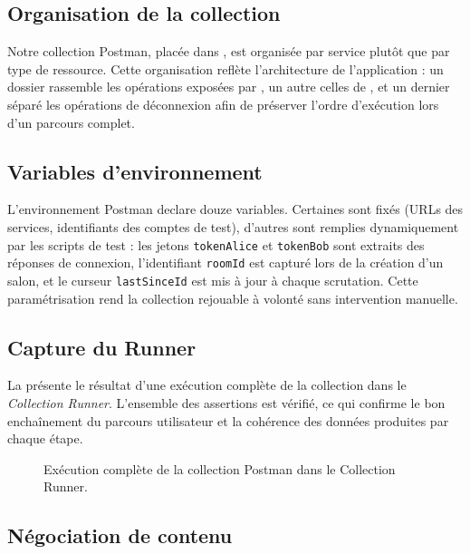 \subsection{Organisation de la collection}

Notre collection Postman, placée dans , est organisée par service plutôt que par type de ressource. Cette organisation reflète l'architecture de l'application : un dossier rassemble les opérations exposées par , un autre celles de , et un dernier séparé les opérations de déconnexion afin de préserver l'ordre d'exécution lors d'un parcours complet.

\subsection{Variables d'environnement}

L'environnement Postman  declare douze variables. Certaines sont fixés (URLs des services, identifiants des comptes de test), d'autres sont remplies dynamiquement par les scripts de test : les jetons \texttt{tokenAlice} et \texttt{tokenBob} sont extraits des réponses de connexion, l'identifiant \texttt{roomId} est capturé lors de la création d'un salon, et le curseur \texttt{lastSinceId} est mis à jour à chaque scrutation. Cette paramétrisation rend la collection rejouable à volonté sans intervention manuelle.

\subsection{Capture du Runner}

La  présente le résultat d'une exécution complète de la collection dans le \emph{Collection Runner}. L'ensemble des assertions est vérifié, ce qui confirme le bon enchaînement du parcours utilisateur et la cohérence des données produites par chaque étape.

\begin{figure}[ht]
  \centering
  \fbox{\rule{0pt}{8cm}\rule{12cm}{0pt}}
  \caption{Exécution complète de la collection Postman dans le Collection Runner.}
  \label{fig:postman-runner}
\end{figure}

\subsection{Négociation de contenu}

